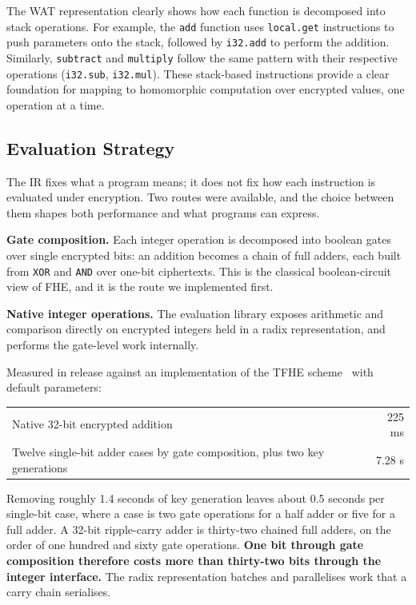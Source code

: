 \documentclass[12pt,a4paper]{article}
\begin{document}
The WAT representation clearly shows how each function is decomposed into stack operations.
For example, the \texttt{add} function uses \texttt{local.get} instructions to push parameters onto the stack, followed by \texttt{i32.add} to perform the addition.
Similarly, \texttt{subtract} and \texttt{multiply} follow the same pattern with their respective operations (\texttt{i32.sub}, \texttt{i32.mul}).
These stack-based instructions provide a clear foundation for mapping to homomorphic computation over encrypted values, one operation at a time.

\subsection{Evaluation Strategy}

The IR fixes what a program means; it does not fix how each instruction is evaluated under encryption.
Two routes were available, and the choice between them shapes both performance and what programs can express.

\textbf{Gate composition.} Each integer operation is decomposed into boolean gates over single encrypted bits: an addition becomes a chain of full adders, each built from \texttt{XOR} and \texttt{AND} over one-bit ciphertexts.
This is the classical boolean-circuit view of FHE, and it is the route we implemented first.

\textbf{Native integer operations.} The evaluation library exposes arithmetic and comparison directly on encrypted integers held in a radix representation, and performs the gate-level work internally.

Measured in release against an implementation of the TFHE scheme~\cite{tfhe_scheme,tfhe_rs} with default parameters:

\begin{center}
\begin{tabular}{lr}
\hline
Native 32-bit encrypted addition & 225 ms \\
Twelve single-bit adder cases by gate composition, plus two key generations & 7.28 s \\
\hline
\end{tabular}
\end{center}

Removing roughly 1.4 seconds of key generation leaves about 0.5 seconds per single-bit case, where a case is two gate operations for a half adder or five for a full adder.
A 32-bit ripple-carry adder is thirty-two chained full adders, on the order of one hundred and sixty gate operations.
\textbf{One bit through gate composition therefore costs more than thirty-two bits through the integer interface.}
The radix representation batches and parallelises work that a carry chain serialises.
\end{document}
